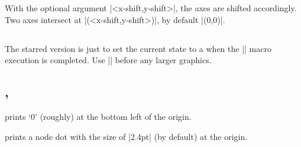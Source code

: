 \begin{tzcode}{.3}
\end{tzcode}

With the optional argument |<x-shift,y-shift>|, the axes are shifted accordingly. Two axes intersect at |(<x-shift,y-shift>)|, by default |(0,0)|.

\begin{tzcode}{.3}
\end{tzcode}

\subsection{\protect\cmd{\tzaxes*}}
\label{ssi:tzaxes*}

The starred version \icmd{\tzaxes*} is just to set the current state to a  when the |\tzaxes| macro execution is completed. Use |\tzaxes*| before any larger graphics.

\begin{tzcode}{.3}
\end{tzcode}


\subsection{\protect\cmd{\tzshoworigin}, \protect\cmd{\tzshoworigin*}}
\label{ssi:tzshoworigin}

\icmd{\tzshoworigin} prints `$0$' (roughly) at the bottom left of the origin.

\begin{tzcode}{.3}
\end{tzcode}

\icmd{\tzshoworigin*} prints a node dot with the size of |2.4pt| (by default) at the origin.

